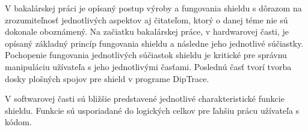 V bakalárskej práci je opísaný postup výroby a fungovania shieldu s dôrazom na zrozumiteľnosť jednotlivých aspektov aj čitateľom, ktorý o danej téme nie sú dokonale oboznámený. Na začiatku bakalárskej práce, v hardwarovej časti, je opísaný základný princíp fungovania shieldu a následne jeho jednotlivé súčiastky. Pochopenie fungovania jednotlivých súčiastok shieldu je kritické pre správnu manipuláciu užívateľa s jeho jednotlivými časťami. Poslednú časť tvorí tvorba dosky plošných spojov pre shield v programe DipTrace.

V softwarovej časti sú bližšie predstavené jednotlivé charakteristické funkcie shieldu. Funkcie sú usporiadané do logických celkov pre ľahšiu prácu užívateľa s kódom.

